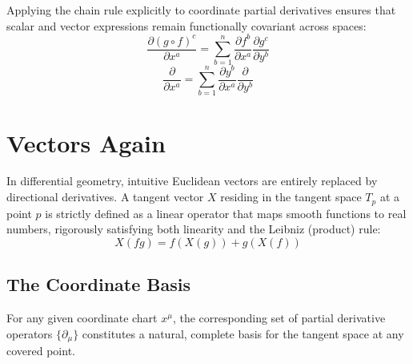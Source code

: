 \documentclass[11pt, a4paper]{report}
\begin{document}
Applying the chain rule explicitly to coordinate partial derivatives ensures that scalar and vector expressions remain functionally covariant across spaces:
\begin{equation} \frac{\partial (g \circ f)^c}{\partial x^a} = \sum_{b=1}^n \frac{\partial f^b}{\partial x^a} \frac{\partial g^c}{\partial y^b} \end{equation}
\begin{equation} \frac{\partial}{\partial x^a} = \sum_{b=1}^n \frac{\partial y^b}{\partial x^a} \frac{\partial}{\partial y^b} \end{equation}

\section{Vectors Again}
In differential geometry, intuitive Euclidean vectors are entirely replaced by directional derivatives. A tangent vector $X$ residing in the tangent space $T_p$ at a point $p$ is strictly defined as a linear operator that maps smooth functions to real numbers, rigorously satisfying both linearity and the Leibniz (product) rule:
\begin{equation} X(fg) = f (X(g)) + g (X(f)) \end{equation}

\subsection*{The Coordinate Basis}
For any given coordinate chart $x^\mu$, the corresponding set of partial derivative operators $\{\partial_\mu\}$ constitutes a natural, complete basis for the tangent space at any covered point.
\end{document}

